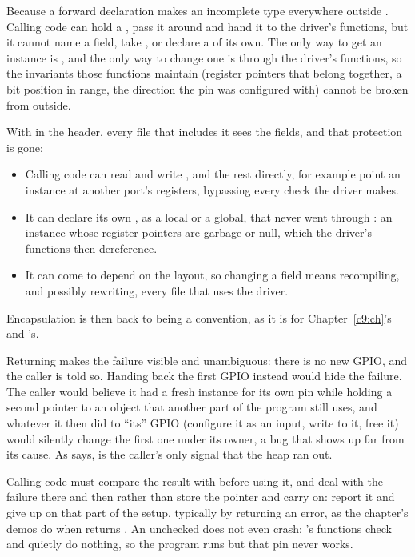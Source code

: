 
Because a forward declaration makes  an incomplete type everywhere outside
. Calling code can hold a , pass it around and hand it to the driver's
functions, but it cannot name a field, take , or declare a  of
its own. The only way to get an instance is , and the only way to change one
is through the driver's functions, so the invariants those functions maintain (register pointers
that belong together, a bit position in range, the direction the pin was configured with) cannot
be broken from outside.

With  in the header, every file that includes it sees the fields, and
that protection is gone:
\begin{itemize}
  \item Calling code can read and write ,  and the rest directly, for example
    point an instance at another port's registers, bypassing every check the driver makes.
  \item It can declare its own , as a local or a global, that never went through
    : an instance whose register pointers are garbage or null, which the
    driver's functions then dereference.
  \item It can come to depend on the layout, so changing a field means recompiling, and possibly
    rewriting, every file that uses the driver.
\end{itemize}
Encapsulation is then back to being a convention, as it is for Chapter~\ref{c9:ch}'s
 and 's.

Returning  makes the failure visible and unambiguous: there is no new GPIO, and the
caller is told so. Handing back the first GPIO instead would hide the failure. The caller would
believe it had a fresh instance for its own pin while holding a second pointer to an object that
another part of the program still uses, and whatever it then did to ``its'' GPIO (configure it as
an input, write to it, free it) would silently change the first one under its owner, a bug that
shows up far from its cause. As  says,  is the caller's only signal that
the heap ran out.

Calling code must compare the result with  before using it, and deal with the failure
there and then rather than store the pointer and carry on: report it and give up on that part of
the setup, typically by returning an error, as the chapter's demos do when  returns
. An unchecked  does not even crash: 's functions check
 and quietly do nothing, so the program runs but that pin never works.
